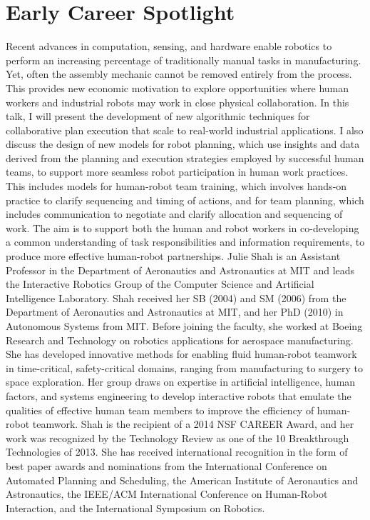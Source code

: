 
\titleformat{\chapter}{\bf \huge}{\thechapter}{1cm}{}
\chapter{Early Career Spotlight}

\vspace{-1.5cm}
{
Recent advances in computation, sensing, and hardware enable robotics to perform an increasing percentage of traditionally manual tasks in manufacturing. Yet, often the assembly mechanic cannot be removed entirely from the process. This provides new economic motivation to explore opportunities where human workers and industrial robots may work in close physical collaboration. In this talk, I will present the development of new algorithmic techniques for collaborative plan execution that scale to real-world industrial applications. I also discuss the design of new models for robot planning, which use insights and data derived from the planning and execution strategies employed by successful human teams, to support more seamless robot participation in human work practices. This includes models for human-robot team training, which involves hands-on practice to clarify sequencing and timing of actions, and for team planning, which includes communication to negotiate and clarify allocation and sequencing of work. The aim is to support both the human and robot workers in co-developing a common understanding of task responsibilities and information requirements, to produce more effective human-robot partnerships.
}{
Julie Shah is an Assistant Professor in the Department of Aeronautics and Astronautics at MIT and leads the Interactive Robotics Group of the Computer Science and Artificial Intelligence Laboratory. Shah received her SB (2004) and SM (2006) from the Department of Aeronautics and Astronautics at MIT, and her PhD (2010) in Autonomous Systems from MIT. Before joining the faculty, she worked at Boeing Research and Technology on robotics applications for aerospace manufacturing. She has developed innovative methods for enabling fluid human-robot teamwork in time-critical, safety-critical domains, ranging from manufacturing to surgery to space exploration. Her group draws on expertise in artificial intelligence, human factors, and systems engineering to develop interactive robots that emulate the qualities of effective human team members to improve the efficiency of human-robot teamwork. Shah is the recipient of a 2014 NSF CAREER Award, and her work was recognized by the Technology Review as one of the 10 Breakthrough Technologies of 2013. She has received international recognition in the form of best paper awards and nominations from the International Conference on Automated Planning and Scheduling, the American Institute of Aeronautics and Astronautics, the IEEE/ACM International Conference on Human-Robot Interaction, and the International Symposium on Robotics.
}


